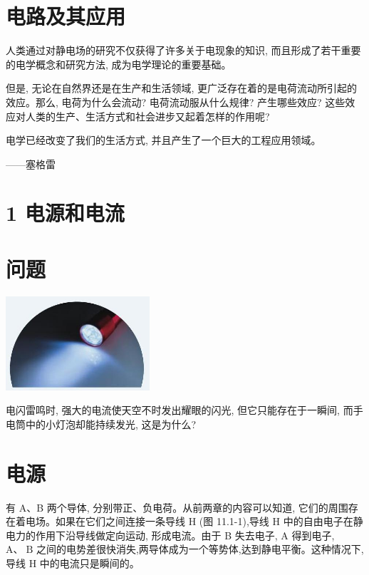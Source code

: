 \documentclass[10pt]{article}
\begin{document}
\section*{电路及其应用}

人类通过对静电场的研究不仅获得了许多关于电现象的知识, 而且形成了若干重要的电学概念和研究方法, 成为电学理论的重要基础。

但是, 无论在自然界还是在生产和生活领域, 更广泛存在着的是电荷流动所引起的效应。那么, 电荷为什么会流动? 电荷流动服从什么规律? 产生哪些效应? 这些效应对人类的生产、生活方式和社会进步又起着怎样的作用呢?

电学已经改变了我们的生活方式, 并且产生了一个巨大的工程应用领域。

——塞格雷

\section*{1 电源和电流}

\section*{问题}

\begin{center}
\includegraphics[max width=0.4\textwidth]{images/01911d5f-8e38-70c0-b5b8-2b399bd115b6_58_594932.jpg}
\end{center}

电闪雷鸣时, 强大的电流使天空不时发出耀眼的闪光, 但它只能存在于一瞬间, 而手电筒中的小灯泡却能持续发光, 这是为什么?

\section*{电源}

有 A、B 两个导体, 分别带正、负电荷。从前两章的内容可以知道, 它们的周围存在着电场。如果在它们之间连接一条导线 \(\mathrm{H}\) (图 11.1-1),导线 \(\mathrm{H}\) 中的自由电子在静电力的作用下沿导线做定向运动, 形成电流。由于 B 失去电子, \(\mathrm{A}\) 得到电子, \(\mathrm{A}\text{、}\mathrm{\;B}\) 之间的电势差很快消失,两导体成为一个等势体,达到静电平衡。这种情况下,导线 \(\mathrm{H}\) 中的电流只是瞬间的。
\end{document}

